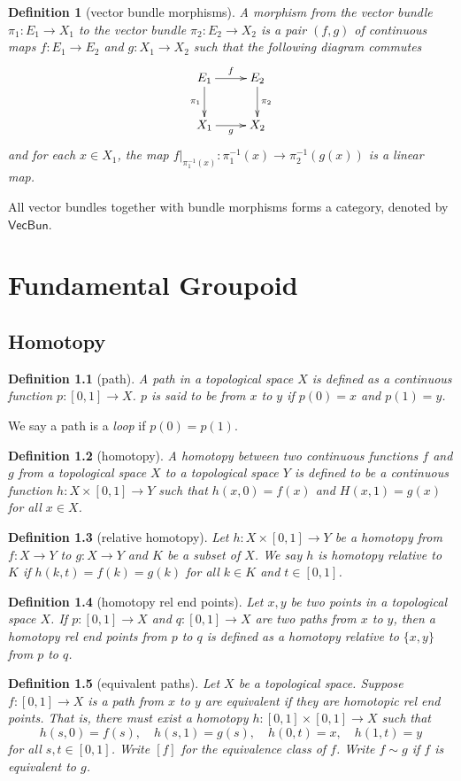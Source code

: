 \documentclass{report}
\newtheorem{definition}{Definition}[section]
\theoremstyle{nonumberplain}
\begin{document}
\begin{definition}[vector bundle morphisms]
	A morphism from the vector bundle $\pi_1: E_1\to X_1$ to the vector bundle $\pi_2: E_2\to X_2$ is a pair $(f,g)$ of continuous maps $f:E_1\to E_2$ and $g:X_1\to X_2$ such that the following diagram commutes
	\[\xymatrix{
		E_1\ar[d]_{\pi_1}\ar[r]^{f}  & E_2\ar[d]^{\pi_2}\\
		X_1\ar[r]_{g}&X_2
		}\]
	and for each $x\in X_1$, the map $\left.f\right|_{\pi_1^{-1}(x)}:\pi_1^{-1}(x)\to \pi_2^{-1}(g(x))$ is a linear map.
\end{definition}

All vector bundles together with bundle morphisms forms a category, denoted by $\mathsf{VecBun}$.

\chapter{Fundamental Groupoid}
\section{Homotopy}
\begin{definition}[path]	
	A \emph{path} in a topological space $X$ is defined as a continuous function $p:[0,1]\to X$. $p$ is said to be from $x$ to $y$ if $p(0)=x$ and $p(1)=y$.
\end{definition}
We say a path is a \emph{loop} if $p(0)=p(1)$.

\begin{definition}[homotopy]
	A \emph{homotopy} between two continuous functions $f$ and $g$ from a topological space $X$ to a topological space $Y$ is defined to be a continuous function $h: X \times[0,1] \rightarrow Y$ such that $h(x, 0)=f(x)$ and $H(x, 1)=g(x)$ for all $x \in X$.
\end{definition}
\begin{definition}[relative homotopy]
	Let $h: X \times[0,1] \rightarrow Y$ be a homotopy from $f:X\to Y$ to $g:X\to Y$ and $K$ be a subset of $X$. We say $h$ is \emph{homotopy relative to $K$} if $h(k, t)=f(k)=g(k)$ for all $k \in K$ and $t \in[0,1]$. 
\end{definition}
\begin{definition}[homotopy rel end points]
	Let $x,y$ be two points in a topological space $X$. If $p:[0,1]\to X$ and $q:[0,1]\to X$ are two paths from $x$ to $y$, then a \emph{homotopy rel end points from $p$ to $q$} is defined as a homotopy relative to $\{x, y\}$ from $p$ to $q$.
\end{definition}
\begin{definition}[equivalent paths]
	Let $X$ be a topological space. Suppose $f: [0,1] \longrightarrow X$ is a path from $x$ to $y$ are \emph{equivalent} if they are homotopic rel end points. That is, there must exist a homotopy $h: [0,1] \times [0,1] \longrightarrow X$ such that
	$$
	h(s, 0)=f(s), \quad h(s, 1)=g(s), \quad h(0, t)=x, \quad h(1, t)=y
	$$
	for all $s,t \in [0,1]$. Write $[f]$ for the equivalence class of $f$. Write $f\sim g$ if $f$ is equivalent to $g$.
\end{definition}
\end{document}
